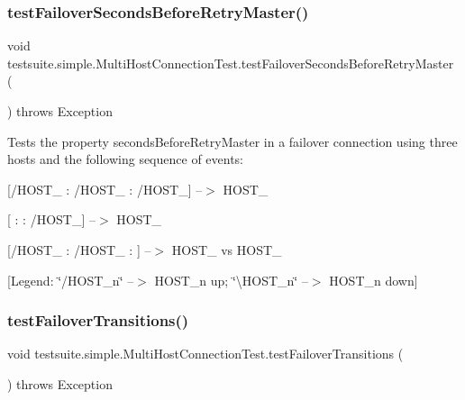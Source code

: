 \subsubsection{\texorpdfstring{test\+Failover\+Seconds\+Before\+Retry\+Master()}{testFailoverSecondsBeforeRetryMaster()}}
{\footnotesize\ttfamily void testsuite.\+simple.\+Multi\+Host\+Connection\+Test.\+test\+Failover\+Seconds\+Before\+Retry\+Master (\begin{DoxyParamCaption}{ }\end{DoxyParamCaption}) throws Exception}

Tests the property \textquotesingle{}seconds\+Before\+Retry\+Master\textquotesingle{} in a failover connection using three hosts and the following sequence of events\+:
\begin{DoxyItemize}
\item \mbox{[}/\+H\+O\+S\+T\+\_ \+: /\+H\+O\+S\+T\+\_ \+: /\+H\+O\+S\+T\+\_\mbox{]} --$>$ H\+O\+S\+T\+\_
\item \mbox{[} \+:  \+: /\+H\+O\+S\+T\+\_\mbox{]} --$>$ H\+O\+S\+T\+\_
\item \mbox{[}/\+H\+O\+S\+T\+\_ \+: /\+H\+O\+S\+T\+\_ \+: \mbox{]} --$>$ H\+O\+S\+T\+\_ vs H\+O\+S\+T\+\_
\end{DoxyItemize}

\mbox{[}Legend\+: \char`\"{}/\+H\+O\+S\+T\+\_\+n\char`\"{} --$>$ H\+O\+S\+T\+\_\+n up; \char`\"{}\textbackslash{}\+H\+O\+S\+T\+\_\+n\char`\"{} --$>$ H\+O\+S\+T\+\_\+n down\mbox{]} \mbox{\label{classtestsuite_1_1simple_1_1_multi_host_connection_test_ac73ab69db61b63a684b6d229fb83e97b}} 
\subsubsection{\texorpdfstring{test\+Failover\+Transitions()}{testFailoverTransitions()}}
{\footnotesize\ttfamily void testsuite.\+simple.\+Multi\+Host\+Connection\+Test.\+test\+Failover\+Transitions (\begin{DoxyParamCaption}{ }\end{DoxyParamCaption}) throws Exception}

